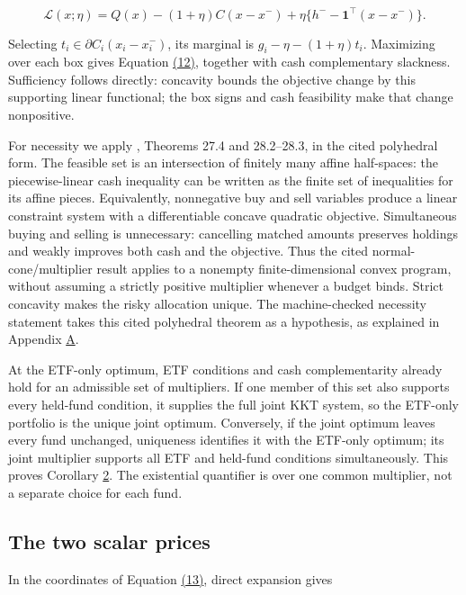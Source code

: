 \documentclass[11pt]{article}
\begin{document}
\begin{equation*}
\mathcal L(x;\eta)=Q(x)-(1+\eta)C(x-x^-)
+\eta\{h^--\mathbf1^\top(x-x^-)\}.
\end{equation*}

Selecting \(t_i\in\partial C_i(x_i-x_i^-)\), its marginal is \(g_i-\eta-(1+\eta)t_i\). Maximizing over each box gives Equation \hyperref[eq:12]{(12)}, together with cash complementary slackness. Sufficiency follows directly: concavity bounds the objective change by this supporting linear functional; the box signs and cash feasibility make that change nonpositive.

For necessity we apply \cite{rockafellar1970convex}, Theorems 27.4 and 28.2--28.3, in the cited polyhedral form. The feasible set is an intersection of finitely many affine half-spaces: the piecewise-linear cash inequality can be written as the finite set of inequalities for its affine pieces. Equivalently, nonnegative buy and sell variables produce a linear constraint system with a differentiable concave quadratic objective. Simultaneous buying and selling is unnecessary: cancelling matched amounts preserves holdings and weakly improves both cash and the objective. Thus the cited normal-cone/multiplier result applies to a nonempty finite-dimensional convex program, without assuming a strictly positive multiplier whenever a budget binds. Strict concavity makes the risky allocation unique. The machine-checked necessity statement takes this cited polyhedral theorem as a hypothesis, as explained in Appendix \hyperref[sec:A]{A}.

At the ETF-only optimum, ETF conditions and cash complementarity already hold for an admissible set of multipliers. If one member of this set also supports every held-fund condition, it supplies the full joint KKT system, so the ETF-only portfolio is the unique joint optimum. Conversely, if the joint optimum leaves every fund unchanged, uniqueness identifies it with the ETF-only optimum; its joint multiplier supports all ETF and held-fund conditions simultaneously. This proves Corollary \hyperref[res:Corollary-2]{2}. The existential quantifier is over one common multiplier, not a separate choice for each fund.

\subsection{The two scalar prices}\label{sec:D.3}

In the coordinates of Equation \hyperref[eq:13]{(13)}, direct expansion gives
\end{document}
